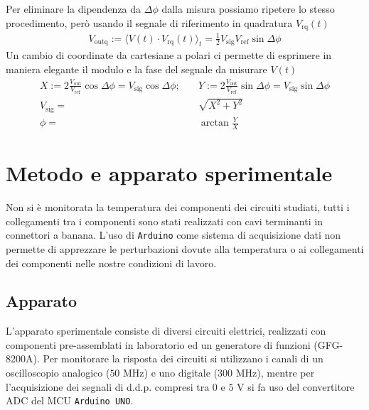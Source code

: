 \documentclass{article}[a4paper, oneside, 11pt]
\begin{document}
Per eliminare la dipendenza da $\Delta \phi$ dalla misura possiamo
ripetere lo stesso procedimento, però usando il segnale di riferimento
in quadratura $V_{\text{rq}}(t)$
\begin{align}
	V_{\text{outq}} := \langle V(t) \cdot V_{\text{rq}} (t) \rangle_t =
	\frac{1}{2} V_{\text{sig}} V_{\text{ref}}\sin{\Delta \phi}
\end{align}
Un cambio di coordinate da cartesiane a polari ci permette di esprimere in
maniera elegante il modulo e la fase del segnale da misurare $V(t)$
\begin{align}
	X := 2 \frac{V_{\text{out}}}{V_{\text{ref}}}\cos{\Delta \phi} =
	V_{\text{sig}}\cos{\Delta \phi}; \quad
	&Y := 2 \frac{V_{\text{out}}}{V_{\text{ref}}}\sin{\Delta \phi} =
	V_{\text{sig}}\sin{\Delta \phi} \\
	V_{\text{sig}} =& \sqrt{X^2 + Y^2}\\
	\phi =& \arctan{\frac{Y}{X}}
\end{align}

\section{Metodo e apparato sperimentale}
Non si è monitorata la temperatura dei componenti dei circuiti studiati,
tutti i collegamenti tra i componenti sono stati realizzati con cavi
terminanti in connettori a banana. L'uso di \verb+Arduino+\cite{arduino}
come sistema di acquisizione dati non permette di apprezzare le perturbazioni
dovute alla temperatura o ai collegamenti dei componenti nelle nostre
condizioni di lavoro.

\subsection{Apparato}
L'apparato sperimentale consiste di diversi circuiti elettrici,
realizzati con componenti pre-assemblati in laboratorio ed un generatore di
funzioni (GFG-8200A).
Per monitorare la risposta dei circuiti si utilizzano i canali di un oscilloscopio
analogico ($50$ MHz) e uno digitale ($300$ MHz), mentre per l'acquisizione dei
segnali di d.d.p. compresi tra $0$ e $5$ V si fa uso del convertitore ADC
del MCU \verb+Arduino UNO+.
\end{document}
